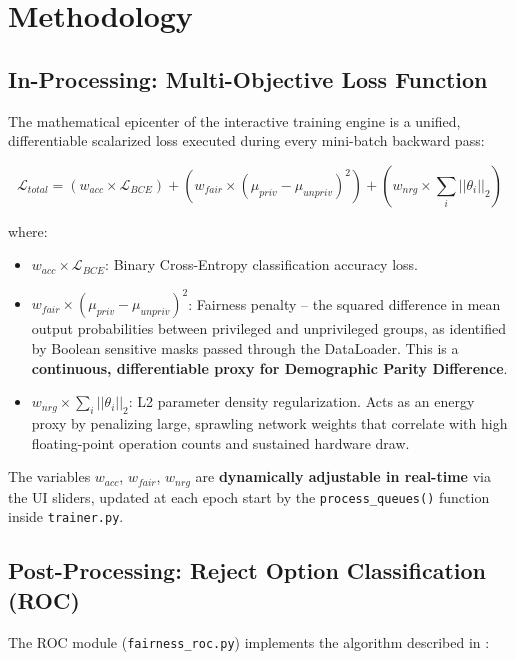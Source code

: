 \documentclass[12pt,a4paper]{article}
\begin{document}
\section{Methodology}

\subsection{In-Processing: Multi-Objective Loss Function}

The mathematical epicenter of the interactive training engine is a unified, differentiable scalarized loss executed during every mini-batch backward pass:

\begin{equation}
    \mathcal{L}_{total} = (w_{acc} \times \mathcal{L}_{BCE}) + (w_{fair} \times (\mu_{priv} - \mu_{unpriv})^2) + (w_{nrg} \times \sum_{i}||\theta_i||_2)
\end{equation}

\noindent where:

\begin{itemize}
    \item $w_{acc} \times \mathcal{L}_{BCE}$: Binary Cross-Entropy classification accuracy loss.
    \item $w_{fair} \times (\mu_{priv} - \mu_{unpriv})^2$: Fairness penalty -- the squared difference in mean output probabilities between privileged and unprivileged groups, as identified by Boolean sensitive masks passed through the DataLoader. This is a \textbf{continuous, differentiable proxy for Demographic Parity Difference}.
    \item $w_{nrg} \times \sum_{i}||\theta_i||_2$: L2 parameter density regularization. Acts as an energy proxy by penalizing large, sprawling network weights that correlate with high floating-point operation counts and sustained hardware draw.
\end{itemize}

The variables $w_{acc}$, $w_{fair}$, $w_{nrg}$ are \textbf{dynamically adjustable in real-time} via the UI sliders, updated at each epoch start by the \texttt{process\_queues()} function inside \texttt{trainer.py}.

\subsection{Post-Processing: Reject Option Classification (ROC)}

The ROC module (\texttt{fairness\_roc.py}) implements the algorithm described in \cite{rN2024multiobj}:
\end{document}

